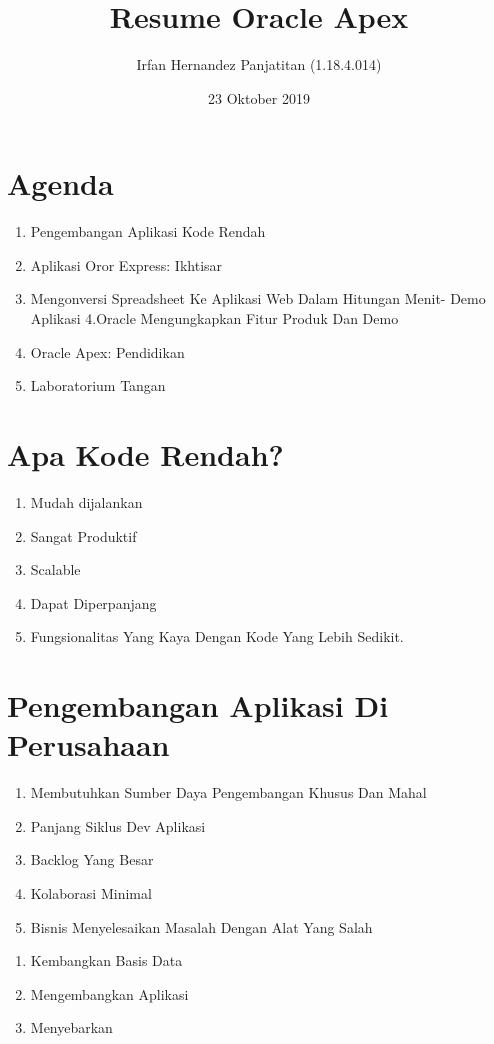 \documentclass{article}
\title{Resume Oracle Apex}
\author{Irfan Hernandez Panjatitan (1.18.4.014) }
\date{23 Oktober 2019}
\begin{document}
\maketitle

\section{Agenda}
\begin{enumerate}
    \item Pengembangan Aplikasi Kode Rendah
    \item Aplikasi Oror Express: Ikhtisar
    \item Mengonversi Spreadsheet Ke Aplikasi Web Dalam Hitungan Menit- Demo Aplikasi 4.Oracle Mengungkapkan Fitur Produk Dan Demo
    \item Oracle Apex: Pendidikan 
    \item Laboratorium Tangan
\end{enumerate}

\section{Apa Kode Rendah?}
\begin{enumerate}
    \item Mudah dijalankan
    \item Sangat Produktif
    \item Scalable
    \item Dapat Diperpanjang
    \item Fungsionalitas Yang Kaya Dengan Kode Yang Lebih Sedikit.
\end{enumerate}

\section{Pengembangan Aplikasi Di Perusahaan}
\begin{enumerate}
     \item Membutuhkan Sumber Daya Pengembangan Khusus Dan Mahal
    \item Panjang Siklus Dev Aplikasi
    \item Backlog Yang Besar
    \item Kolaborasi Minimal
    \item Bisnis Menyelesaikan Masalah Dengan Alat Yang Salah
\end{enumerate}
\newpage
 \usepackage{Oracle Apex:}
 \begin{enumerate}
     \item Kembangkan Basis Data
     \item Mengembangkan Aplikasi
     \item Menyebarkan
 \end{enumerate}
 
\end{document}
